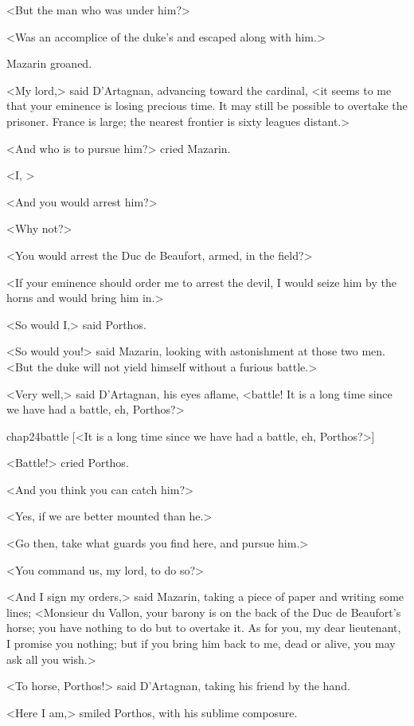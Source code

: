 <But the man who was under him?>

<Was an accomplice of the duke's and escaped along with him.>

Mazarin groaned.

<My lord,> said D'Artagnan, advancing toward the cardinal, <it seems to me that your eminence is losing precious time. It may still be possible to overtake the prisoner. France is large; the nearest frontier is sixty leagues distant.>

<And who is to pursue him?> cried Mazarin.

<I, >

<And you would arrest him?>

<Why not?>

<You would arrest the Duc de Beaufort, armed, in the field?>

<If your eminence should order me to arrest the devil, I would seize him by the horns and would bring him in.>

<So would I,> said Porthos.

<So would you!> said Mazarin, looking with astonishment at those two men. <But the duke will not yield himself without a furious battle.>

<Very well,> said D'Artagnan, his eyes aflame, <battle! It is a long time since we have had a battle, eh, Porthos?>


\begin{bwbigpic}
	[\basicscale] 
	{chap24battle}
	[<It is a long time since we have had a battle, eh, Porthos?>]
\end{bwbigpic}


<Battle!> cried Porthos.

<And you think you can catch him?>

<Yes, if we are better mounted than he.>

<Go then, take what guards you find here, and pursue him.>

<You command us, my lord, to do so?>

<And I sign my orders,> said Mazarin, taking a piece of paper and writing some lines; <Monsieur du Vallon, your barony is on the back of the Duc de Beaufort's horse; you have nothing to do but to overtake it. As for you, my dear lieutenant, I promise you nothing; but if you bring him back to me, dead or alive, you may ask all you wish.>

<To horse, Porthos!> said D'Artagnan, taking his friend by the hand.

<Here I am,> smiled Porthos, with his sublime composure.


